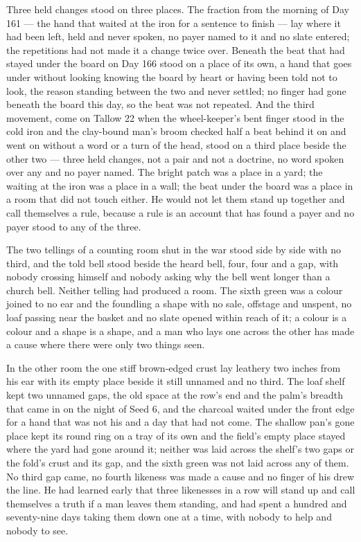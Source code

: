 Three held changes stood on three places. The fraction from the morning of Day 161 --- the hand that waited at the iron for a sentence to finish --- lay where it had been left, held and never spoken, no payer named to it and no slate entered; the repetitions had not made it a change twice over. Beneath  the beat that had stayed under the board on Day 166 stood on a place of its own, a hand that goes under without looking knowing the board by heart or having been told not to look, the reason standing between the two and never settled; no finger had gone beneath the board this day, so the beat was not repeated. And the third movement, come on Tallow 22 when the wheel-keeper's bent finger stood in the cold iron and the clay-bound man's broom checked half a beat behind it on  and went on without a word or a turn of the head, stood on a third place beside the other two --- three held changes, not a pair and not a doctrine, no word spoken over any and no payer named. The bright patch was a place in a yard; the waiting at the iron was a place in a wall; the beat under the board was a place in a room that did not touch either. He would not let them stand up together and call themselves a rule, because a rule is an account that has found a payer and no payer stood to any of the three.

The two tellings of a counting room shut in the war stood side by side with no third, and the told bell stood beside the heard bell, four, four and a gap, with nobody crossing himself and nobody asking why the bell went longer than a church bell. Neither telling had produced a room. The sixth green was a colour joined to no ear and the foundling a shape with no sale, offstage and unspent, no loaf passing near the basket and no slate opened within reach of it; a colour is a colour and a shape is a shape, and a man who lays one across the other has made a cause where there were only two things seen.

In the other room the one stiff brown-edged crust lay leathery two inches from his ear with its empty place beside it still unnamed and no third. The loaf shelf kept two unnamed gaps, the old space at the row's end and the palm's breadth that came in on the night of Seed 6, and the charcoal waited under the front edge for a hand that was not his and a day that had not come. The shallow pan's gone place kept its round ring on a tray of its own and the field's empty place stayed where the yard had gone around it; neither was laid across the shelf's two gaps or the fold's crust and its gap, and the sixth green was not laid across any of them. No third gap came, no fourth likeness was made a cause and no finger of his drew the line. He had learned early that three likenesses in a row will stand up and call themselves a truth if a man leaves them standing, and had spent a hundred and seventy-nine days taking them down one at a time, with nobody to help and nobody to see.

